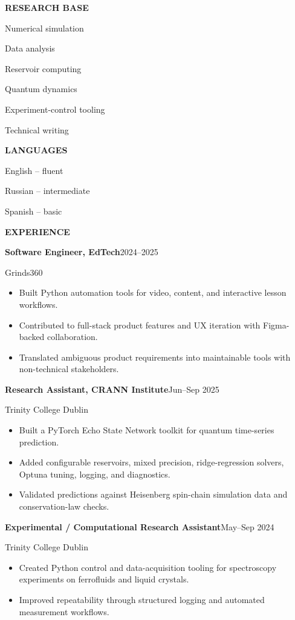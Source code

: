 \documentclass[10pt,a4paper]{article}
\newcommand{\sectiontitle}[1]{%
  \vspace{8.5pt}
  {\small\bfseries\color{accent}\MakeUppercase{#1}}\par
  \vspace{2.5pt}{\color{rule}\hrule height 0.55pt}\vspace{4.8pt}
}
\newcommand{\role}[3]{%
  {\bfseries #1}\hfill{\small\color{muted}#2}\par
  {\small\color{muted}#3}\par
}
\begin{document}
\begin{minipage}[t][0.835\textheight][t]{0.315\linewidth}
\sectiontitle{Research Base}
{\small
Numerical simulation\par
Data analysis\par
Reservoir computing\par
Quantum dynamics\par
Experiment-control tooling\par
Technical writing\par
}

\vfill
\sectiontitle{Languages}
{\small English -- fluent\par Russian -- intermediate\par Spanish -- basic}

\end{minipage}
\hfill
\begin{minipage}[t][0.835\textheight][t]{0.645\linewidth}
\raggedright

\sectiontitle{Experience}

\role{Software Engineer, EdTech}{2024--2025}{Grinds360}
\begin{itemize}
  \item Built Python automation tools for video, content, and interactive lesson workflows.
  \item Contributed to full-stack product features and UX iteration with Figma-backed collaboration.
  \item Translated ambiguous product requirements into maintainable tools with non-technical stakeholders.
\end{itemize}
\vspace{2pt}

\role{Research Assistant, CRANN Institute}{Jun--Sep 2025}{Trinity College Dublin}
\begin{itemize}
  \item Built a PyTorch Echo State Network toolkit for quantum time-series prediction.
  \item Added configurable reservoirs, mixed precision, ridge-regression solvers, Optuna tuning, logging, and diagnostics.
  \item Validated predictions against Heisenberg spin-chain simulation data and conservation-law checks.
\end{itemize}
\vspace{2pt}

\role{Experimental / Computational Research Assistant}{May--Sep 2024}{Trinity College Dublin}
\begin{itemize}
  \item Created Python control and data-acquisition tooling for spectroscopy experiments on ferrofluids and liquid crystals.
  \item Improved repeatability through structured logging and automated measurement workflows.
\end{itemize}
\vspace{2pt}


\end{minipage}
\end{document}
